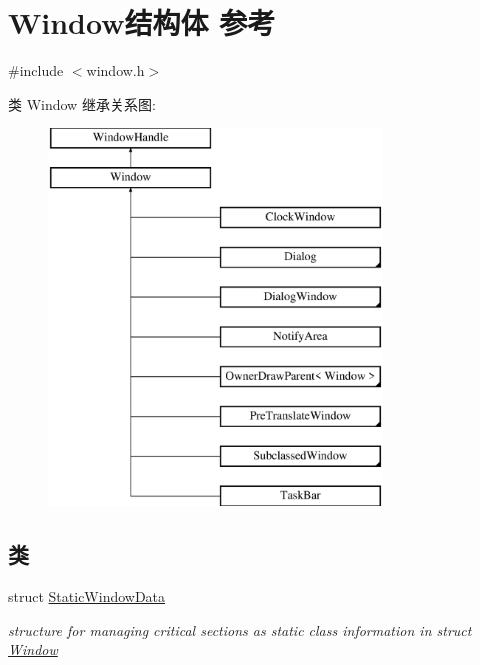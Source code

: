 \hypertarget{struct_window}{}\section{Window结构体 参考}
\label{struct_window}


{\ttfamily \#include $<$window.\+h$>$}

类 Window 继承关系图\+:\begin{figure}[H]
\begin{center}
\leavevmode
\includegraphics[height=10.000000cm]{struct_window}
\end{center}
\end{figure}
\subsection*{类}
\begin{DoxyCompactItemize}
\item 
struct \hyperlink{struct_window_1_1_static_window_data}{Static\+Window\+Data}
\begin{DoxyCompactList}\small\item\em structure for managing critical sections as static class information in struct \hyperlink{struct_window}{Window} \end{DoxyCompactList}\end{DoxyCompactItemize}
